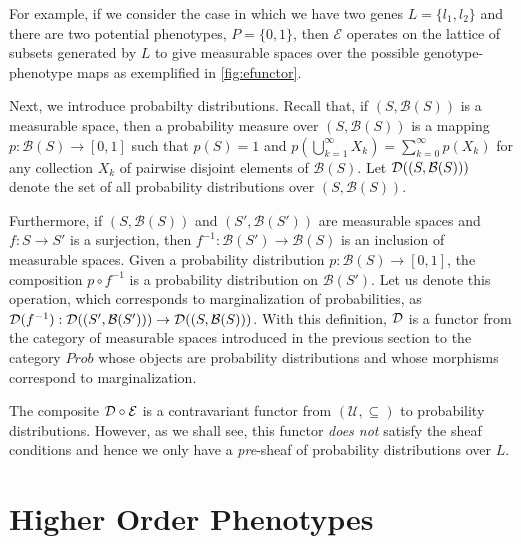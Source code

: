 For example, if we consider the case in which we have two genes $L=\{l_1,l_2\}$ and there are two potential phenotypes, $P=\{0,1\}$, then $\mathcal{E}$ operates on the lattice of subsets generated by $L$ to give measurable spaces over the possible genotype-phenotype maps as exemplified in \ref{fig:efunctor}.

Next, we introduce probabilty distributions.  Recall that, if $(S,\mathcal{B}(S))$ is a measurable space, then a probability measure over $(S,\mathcal{B}(S))$ is a mapping $p \colon \mathcal{B}(S) \to [0,1]$ such that $p(S) = 1$ and $p(\bigcup_{k=1}^\infty X_k) = \sum_{k=0}^\infty p(X_k)$ for any collection $X_k$ of pairwise disjoint elements of $\mathcal{B}(S)$.  Let $\mathcal{D}((S,\mathcal{B}(S)))$ denote the set of all probability distributions over $(S,\mathcal{B}(S))$.

Furthermore, if $(S, \mathcal{B}(S))$ and $(S',\mathcal{B}(S'))$ are measurable spaces and $f:S \rightarrow S'$ is a surjection, then $f^{-1} : \mathcal{B}(S') \rightarrow \mathcal{B}(S)$ is an inclusion of measurable spaces. Given a probability distribution $p \colon \mathcal{B}(S) \to [0,1]$, the composition $p \circ f^{-1}$ is a probability distribution on $\mathcal{B}(S')$.  Let us denote this operation, which corresponds to marginalization of probabilities, as $\mathcal{D}(f^{-1}) : \mathcal{D}((S',\mathcal{B}(S'))) \to \mathcal{D}((S,\mathcal{B}(S)))$.  With this definition, $\mathcal{D}$ is a functor from the category of measurable spaces introduced in the previous section to the category $Prob$ whose objects are probability distributions and whose morphisms correspond to marginalization.

The composite $\mathcal{D} \circ \mathcal{E}$ is a contravariant functor from $(\mathcal{U}, \subseteq)$ to probability distributions.  However, as we shall see, this functor \emph{does not} satisfy the sheaf conditions and hence we only have a \emph{pre}-sheaf of probability distributions over $L$.

\section{Higher Order Phenotypes}

